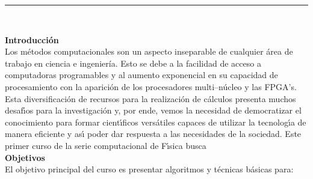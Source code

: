 \documentclass[letterpaper,10pt,onecolumn]{article}
\begin{document}




\noindent\rule{\textwidth}{1pt}\\[-0.1cm]

\addtocounter{mysection}{1}

\noindent\textbf{\large {} \quad Introducci\'on}\\[-0.2cm]


\noindent\normalsize Los m\'etodos computacionales son un aspecto
inseparable de cualquier \'area de trabajo en ciencia e ingenier\'ia.
Esto se debe a la facilidad de acceso a 
computadoras programables  y al aumento exponencial en su capacidad de
procesamiento con la aparici\'on de los procesadores multi--n\'ucleo y las FPGA's.
Esta diversificaci\'on de recursos para la realizaci\'on de c\'alculos presenta muchos desaf\'{\i}os para la investigaci\'on
y, por ende, vemos la necesidad de democratizar el conocimiento para formar
cient\'{\i}ficos vers\'atiles capaces de utilizar la tecnolog\'{\i}a
de manera eficiente y as\'{\i} poder dar respuesta a las necesidades de la sociedad. 
Este primer curso de la serie computacional de F\'{\i}sica busca 
\\[0.1cm] 

\noindent\textbf{\large {} \quad Objetivos}\\[-0.2cm]

\noindent\normalsize El objetivo principal del curso es presentar
algoritmos y t\'ecnicas b\'asicas para:
\end{document}

